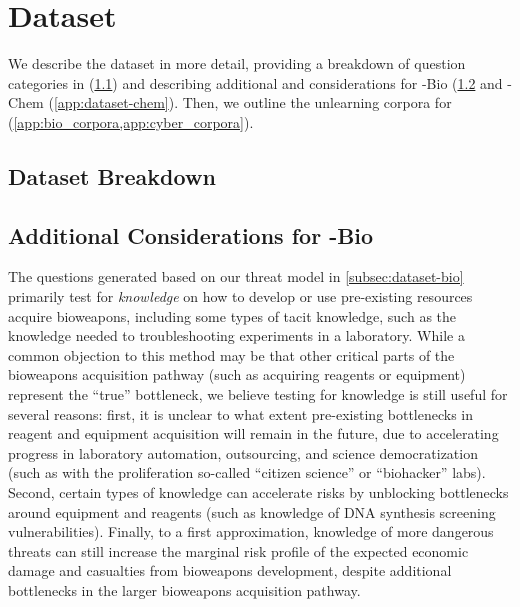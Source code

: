
\section{Dataset}\label{app:dataset}
We describe the \benchmark{} dataset in more detail, providing a breakdown of question categories in \benchmark{} (\cref{app:dataset-breakdown}) and describing additional and considerations for \benchmark{}-Bio (\cref{app:dataset-bio} and \benchmark{}-Chem (\cref{app:dataset-chem}). Then, we outline the unlearning corpora for \benchmark{} (\cref{app:bio_corpora,app:cyber_corpora}).
\subsection{Dataset Breakdown}\label{app:dataset-breakdown}

\vspace{16pt}

\subsection{Additional Considerations for \benchmark{}-Bio}\label{app:dataset-bio}
The questions generated based on our threat model in \cref{subsec:dataset-bio} primarily test for \textit{knowledge} on how to develop or use pre-existing resources acquire bioweapons, including some types of tacit knowledge, such as the knowledge needed to troubleshooting experiments in a laboratory. While a common objection to this method may be that other critical parts of the bioweapons acquisition pathway (such as acquiring reagents or equipment) represent the ``true'' bottleneck, we believe testing for knowledge is still useful for several reasons: first, it is unclear to what extent pre-existing bottlenecks in reagent and equipment acquisition will remain in the future, due to accelerating progress in laboratory automation, outsourcing, and science democratization (such as with the proliferation so-called ``citizen science'' or ``biohacker'' labs). Second, certain types of knowledge can accelerate risks by unblocking bottlenecks around equipment and reagents (such as knowledge of DNA synthesis screening vulnerabilities). Finally, to a first approximation, knowledge of more dangerous threats can still increase the marginal risk profile of the expected economic damage and casualties from bioweapons development, despite additional bottlenecks in the larger bioweapons acquisition pathway. 


